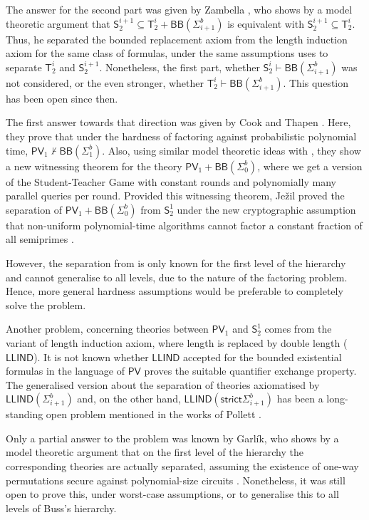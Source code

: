 \documentclass[11pt]{article}
\newcommand{\PV}{\mathsf{PV}}
\newcommand{\SOT}{\mathsf{S}^1_2}
\theoremstyle{definition}
\theoremstyle{definition}
\theoremstyle{remark}
\begin{document}
The answer for the second part was given by Zambella \cite{Zambella96}, who shows by a model theoretic argument that $\mathsf{S}^{i+1}_2\subseteq\mathsf{T}^i_2+\mathsf{BB}(\Sigma^b_{i+1})$ is equivalent with $ \mathsf{S}^{i+1}_2\subseteq\mathsf{T}^i_2$. Thus, he separated the bounded replacement axiom from the length induction axiom for the same class of formulas, under the same assumptions \cite{KrajicekPT91} uses to separate $\mathsf{T}^i_2$ and $\mathsf{S}^{i+1}_2$. Nonetheless, the first part, whether $\mathsf{S}^i_2\vdash \mathsf{BB}(\Sigma^b_{i+1})$ was not considered, or the even stronger, whether $\mathsf{T}^i_2\vdash \mathsf{BB}(\Sigma^b_{i+1})$. This question has been open since then.

The first answer towards that direction was given by Cook and Thapen \cite{DBLP:journals/tocl/CookT06}. Here, they prove that under the hardness of factoring against probabilistic polynomial time, $\PV_1\not\vdash \mathsf{BB}(\Sigma^b_1)$. Also, using similar model theoretic ideas with \cite{Zambella96}, they show a new witnessing theorem for the theory $\PV_1+\mathsf{BB}(\Sigma^b_0)$, where we get a version of the Student-Teacher Game with constant rounds and polynomially many parallel queries per round. Provided this witnessing theorem, Je\v{z}il proved the separation of $\PV_1+\mathsf{BB}(\Sigma^b_0)$ from $\SOT$ under the new cryptographic assumption that non-uniform polynomial-time algorithms cannot factor a constant fraction of all semiprimes \cite{jezil}.

However, the separation from \cite{DBLP:journals/tocl/CookT06} is only known for the first level of the hierarchy and cannot generalise to all levels, due to the nature of the factoring problem. Hence, more general hardness assumptions would be preferable to completely solve the problem. 

Another problem, concerning theories between $\PV_1$ and $\SOT$ comes from the variant of length induction axiom, where length is replaced by double length ($\mathsf{LLIND}$). It is not known whether $\mathsf{LLIND}$ accepted for the bounded existential formulas in the language of $\PV$ proves the suitable quantifier exchange property. The generalised version about the separation of theories axiomatised by $\mathsf{LLIND}(\Sigma^b_{i+1})$ and, on the other hand, $\mathsf{LLIND}(\mathsf{strict}\Sigma^b_{i+1})$ has been a long-standing open problem mentioned in the works of Pollett \cite{pollett1997arithmetic,POLLETT1999189,pollett2018finite}.

Only a partial answer to the problem was known by Garlík, who shows by a model theoretic argument that on the first level of the hierarchy the corresponding theories are actually separated, assuming the existence of one-way permutations secure against polynomial-size circuits \cite{garlik2016construction}. Nonetheless, it was still open to prove this, under worst-case assumptions, or to generalise this to all levels of Buss's hierarchy.
\end{document}
